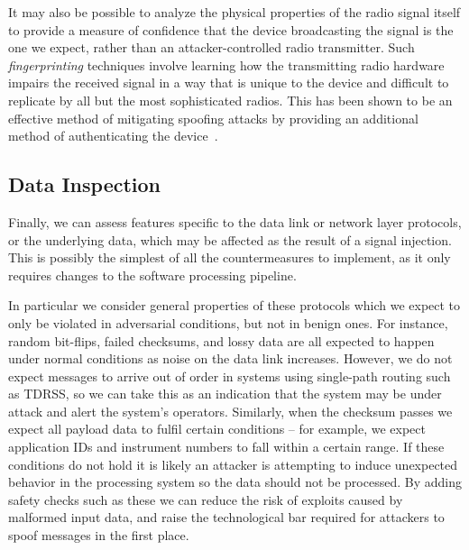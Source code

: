 It may also be possible to analyze the physical properties of the radio signal itself to provide a measure of confidence that the device broadcasting the signal is the one we expect, rather than an attacker-controlled radio transmitter.
Such \textit{fingerprinting} techniques involve learning how the transmitting radio hardware impairs the received signal in a way that is unique to the device and difficult to replicate by all but the most sophisticated radios.
This has been shown to be an effective method of mitigating spoofing attacks by providing an additional method of authenticating the device~\cite{sankheNo2020,oligeri2020past}.


\subsection{Data Inspection}

Finally, we can assess features specific to the data link or network layer protocols, or the underlying data, which may be affected as the result of a signal injection.
This is possibly the simplest of all the countermeasures to implement, as it only requires changes to the software processing pipeline.

In particular we consider general properties of these protocols which we expect to only be violated in adversarial conditions, but not in benign ones.
For instance, random bit-flips, failed checksums, and lossy data are all expected to happen under normal conditions as noise on the data link increases.
However, we do not expect messages to arrive out of order in systems using single-path routing such as TDRSS, so we can take this as an indication that the system may be under attack and alert the system's operators.
Similarly, when the checksum passes we expect all payload data to fulfil certain conditions -- for example, we expect application IDs and instrument numbers to fall within a certain range.
If these conditions do not hold it is likely an attacker is attempting to induce unexpected behavior in the processing system so the data should not be processed.
By adding safety checks such as these we can reduce the risk of exploits caused by malformed input data, and raise the technological bar required for attackers to spoof messages in the first place.


